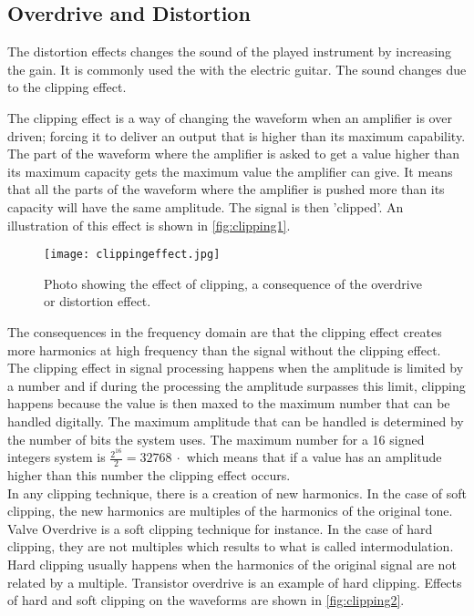 \subsection{Overdrive and Distortion} 

The distortion effects changes the sound of the played instrument by increasing the gain. It is commonly used the with the electric guitar. The sound changes due to the clipping effect. \\

The clipping effect is a way of changing the waveform when an amplifier is over driven; forcing it to deliver an output that is higher than its maximum capability. \\
The part of the waveform where the amplifier is asked to get a value higher than its maximum capacity gets the maximum value the amplifier can give. It means that all the parts of the waveform where the amplifier is pushed more than its capacity will have the same amplitude. The signal is then 'clipped'. An illustration of this effect is shown in \autoref{fig:clipping1}.\\

\begin{figure} [htbp]
	\centering
  \texttt{[image: clippingeffect.jpg]}
  \caption{Photo showing the effect of clipping, a consequence of the overdrive or distortion effect.}
  \label{fig:clipping1}
\end{figure}


The consequences in the frequency domain are that the clipping effect creates more harmonics at high frequency than the signal without the clipping effect. \\

The clipping effect in signal processing happens when the amplitude is limited by a number and if during the processing the amplitude surpasses this limit, clipping happens because the value is then maxed to the maximum number that can be handled digitally. The maximum amplitude that can be handled is determined by the number of bits the system uses. The maximum number for a \SI{16}{\bit}  signed integers system is $\frac{2^{16}}{2} = \SI{32768}{\cdot}$ which means that if a value has an amplitude higher than this number the clipping effect occurs. \\

In any clipping technique, there is a creation of new harmonics. In the case of soft clipping, the new harmonics are multiples of the harmonics of the original tone. Valve Overdrive is a soft clipping technique for instance. In the case of hard clipping, they are not multiples which results to what is called intermodulation. Hard clipping usually happens when the harmonics of the original signal are not related by a multiple. Transistor overdrive is an example of hard clipping.  Effects of hard and soft clipping on the waveforms are shown in \autoref{fig:clipping2}.

